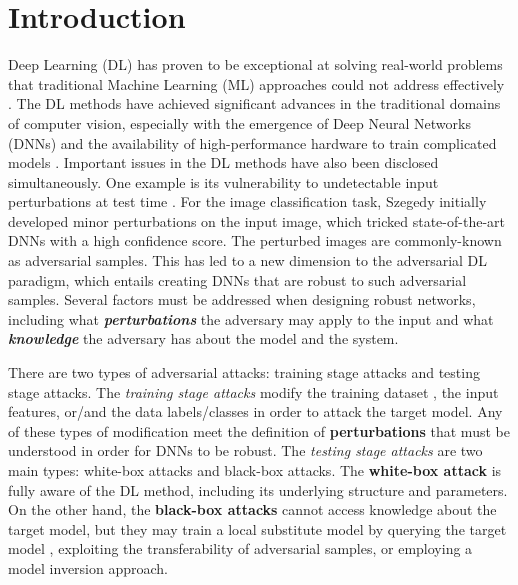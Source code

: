 \section{Introduction}
Deep Learning (DL) has proven to be exceptional at solving real-world problems that traditional Machine Learning (ML) approaches could not address effectively \cite{abuhamad2021large,ali2022effective}. The DL methods have achieved significant advances in the traditional domains of computer vision, especially with the emergence of Deep Neural Networks (DNNs) and the availability of high-performance hardware to train complicated models \cite{chakraborty2021survey}. Important issues in the DL methods have also been disclosed simultaneously. One example is its vulnerability to undetectable input perturbations at test time \cite{abdukhamidov2023hardening, juraev2022depth}. 
For the image classification task, Szegedy \etal \cite{szegedy2014intriguing} initially developed minor perturbations on the input image, which tricked state-of-the-art DNNs with a high confidence score. The perturbed images are commonly-known as adversarial samples. This has led to a new dimension to the adversarial DL paradigm, which entails creating DNNs that are robust to such adversarial samples. Several factors must be addressed when designing robust networks, including what \textbf{\em perturbations} the adversary may apply to the input and what \textbf{\em knowledge} the adversary has about the model and the system. 

There are two types of adversarial attacks:  training stage attacks and  testing stage attacks. The \textit{training stage attacks} modify the training dataset \cite{barreno2006can}, the input features, or/and the data labels/classes in order to attack the target model. Any of these types of modification meet the definition of \textbf{perturbations} that must be understood in order for DNNs to be robust. The \textit{testing stage attacks} are two main types:  white-box attacks and  black-box attacks. The \textbf{white-box attack} is fully aware of the DL method, including its underlying structure and parameters. On the other hand, the \textbf{black-box attacks} cannot access knowledge about the target model, but they may train a local substitute model by querying the target model \cite{papernot2017practical}, exploiting the transferability of adversarial samples, or employing a model inversion approach.

